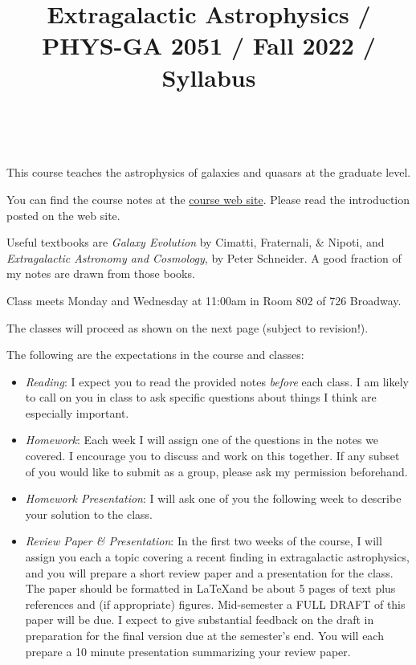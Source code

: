 \documentclass[11pt, preprint]{aastex}
\begin{document}
\title{\bf Extragalactic Astrophysics / PHYS-GA 2051 / Fall 2022 / Syllabus }

~

\noindent This course teaches the astrophysics of galaxies and quasars
at the graduate level.

\noindent You can find the course notes at the
\href{http://blanton144.github.io/exex}{course web site}. Please read
the introduction posted on the web site.

\noindent Useful textbooks are {\it Galaxy Evolution} by Cimatti,
Fraternali, \& Nipoti, and {\it Extragalactic Astronomy and
  Cosmology}, by Peter Schneider. A good fraction of my notes are
drawn from those books.

\noindent Class meets Monday and Wednesday at 11:00am in Room 802 of
726 Broadway.

\noindent The classes will proceed as shown on the next page (subject
to revision!).

\noindent The following are the expectations in the course and
classes:

\begin{itemize}

\item {\it Reading}: I expect you to read the provided notes {\it
  before} each class. I am likely to call on you in class to ask 
  specific questions about things I think are especially important.

\item {\it Homework}: Each week I will assign one of the questions in
  the notes we covered. I encourage you to discuss and work on this
  together. If any subset of you would like to submit as a group,
  please ask my permission beforehand.

\item {\it Homework Presentation}: I will ask one of you the following
  week to describe your solution to the class. 

\item {\it Review Paper \& Presentation}: In the first two weeks of
  the course, I will assign you each a topic covering a recent finding
  in extragalactic astrophysics, and you will prepare a short review
  paper and a presentation for the class. The paper should be
  formatted in \LaTeX and be about 5 pages of text plus references and
  (if appropriate) figures. Mid-semester a FULL DRAFT of this paper
  will be due. I expect to give substantial feedback on the draft in
  preparation for the final version due at the semester's end. You
  will each prepare a 10 minute presentation summarizing your review
  paper.

\end{itemize}
\end{document}
